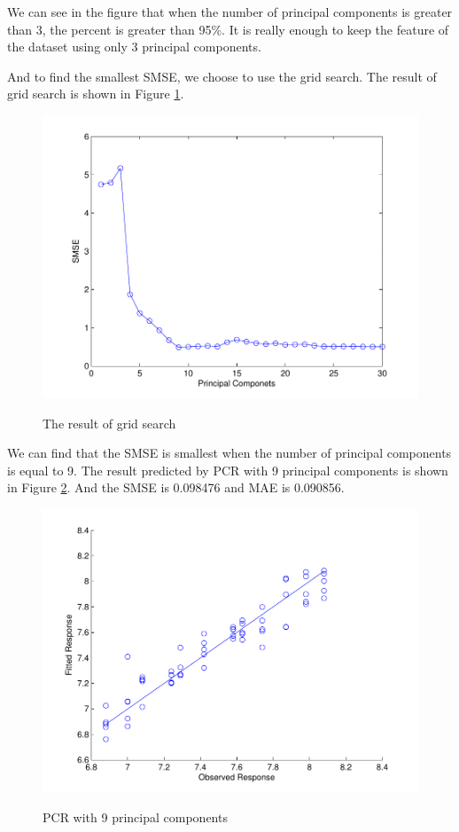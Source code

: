 \documentclass[a4paper]{article}
\begin{document}
We can see in the figure that when the number of principal components is greater than 3, the percent is greater than 95\%. It is really enough to keep the feature of the dataset using only 3 principal components.

And to find the smallest SMSE, we choose to use the grid search. The result of grid search is shown in Figure \ref{pcrb2}.
\begin{figure}[h]
  \centering
  \includegraphics[width=.6\textwidth]{images/gsearch_PCR.pdf}\\
  \caption{The result of grid search}\label{pcrb2}
\end{figure}

\newpage
We can find that the SMSE is smallest when the number of principal components is equal to 9. The result predicted by PCR with 9 principal components is shown in Figure \ref{pic4}. And the SMSE is 0.098476 and MAE is 0.090856.
\begin{figure}[h]
  \centering
  \includegraphics[width=.6\textwidth]{images/predict_PCR.pdf}\\
  \caption{PCR with 9 principal components}\label{pic4}
\end{figure}
\end{document}
